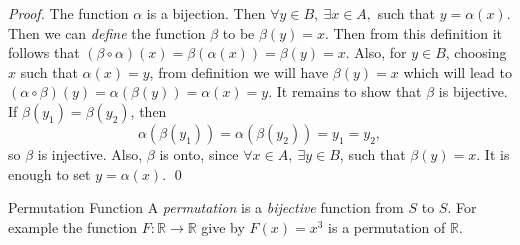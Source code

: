\textit{Proof.} The function $\alpha$ is a bijection. Then $\forall y \in B,\ \exists x \in A,$ such that $y=\alpha(x)$. Then we can \textit{define} the function $\beta$ to be $\beta(y) = x$. Then from this definition it follows that $(\beta \circ \alpha)(x) = \beta (\alpha (x)) = \beta(y) = x$. Also, for $y\in B$, choosing $x$ such that $\alpha(x)=y$, from definition we will have $\beta(y)=x$ which will lead to $(\alpha \circ \beta)(y)=\alpha (\beta (y))= \alpha(x)=y$. It remains to show that $\beta$ is bijective. If $\beta(y_1) = \beta(y_2)$, then \[ \alpha(\beta(y_1))  = \alpha(\beta(y_2)) = y_1 = y_2, \]
so $\beta$ is injective. Also, $\beta$ is onto, since $\forall x \in A,\ \exists y \in B$, such that $\beta(y)=x$. It is enough to set $y = \alpha(x)$. \qed 	 

\begin{example}{Permutation Function}
	A \textit{permutation} is a \textit{bijective} function from $S$ to $S$. For example the function $F:\mathbb{R} \rightarrow \mathbb{R}$ give by $F(x) = x^3$ is a permutation of $\mathbb{R}$.
\end{example}
